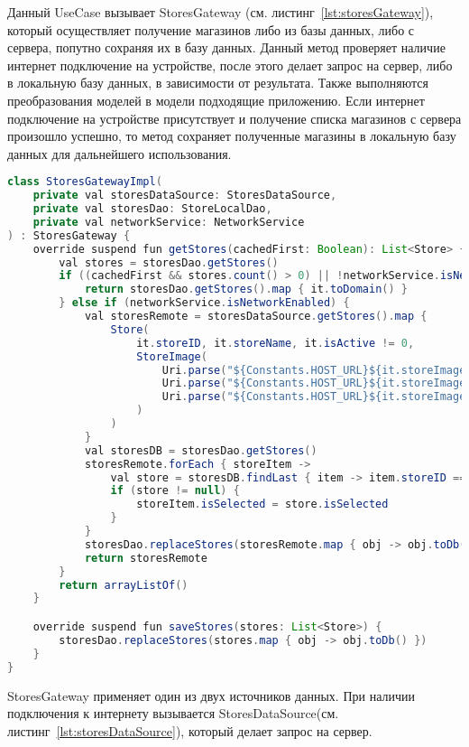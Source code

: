 Данный UseCase вызывает StoresGateway (см. листинг~\ref{lst:storesGateway}), который осуществляет получение магазинов либо из базы данных, либо с сервера, попутно сохраняя их в базу данных. Данный метод проверяет наличие интернет подключение на устройстве, после этого делает запрос на сервер, либо в локальную базу данных, в зависимости от результата. Также выполняются преобразования моделей в модели подходящие приложению. Если интернет подключение на устройстве присутствует и получение списка магазинов с сервера произошло успешно, то метод сохраняет полученные магазины в локальную базу данных для дальнейшего использования.
\begin{lstlisting}[language=Java,label={lst:storesGateway},caption={StoresGateway}]
class StoresGatewayImpl(
    private val storesDataSource: StoresDataSource,
    private val storesDao: StoreLocalDao,
    private val networkService: NetworkService
) : StoresGateway {
    override suspend fun getStores(cachedFirst: Boolean): List<Store> {
        val stores = storesDao.getStores()
        if ((cachedFirst && stores.count() > 0) || !networkService.isNetworkEnabled) {
            return storesDao.getStores().map { it.toDomain() }
        } else if (networkService.isNetworkEnabled) {
            val storesRemote = storesDataSource.getStores().map {
                Store(
                    it.storeID, it.storeName, it.isActive != 0,
                    StoreImage(
                        Uri.parse("${Constants.HOST_URL}${it.storeImage.bannerPath}"),
                        Uri.parse("${Constants.HOST_URL}${it.storeImage.logoPath}"),
                        Uri.parse("${Constants.HOST_URL}${it.storeImage.iconPath}")
                    )
                )
            }
            val storesDB = storesDao.getStores()
            storesRemote.forEach { storeItem ->
                val store = storesDB.findLast { item -> item.storeID == storeItem.id }
                if (store != null) {
                    storeItem.isSelected = store.isSelected
                }
            }
            storesDao.replaceStores(storesRemote.map { obj -> obj.toDb() })
            return storesRemote
        }
        return arrayListOf()
    }

    override suspend fun saveStores(stores: List<Store>) {
        storesDao.replaceStores(stores.map { obj -> obj.toDb() })
    }
}

\end{lstlisting}


StoresGateway применяет один из двух источников данных. При наличии подключения к интернету вызывается StoresDataSource(см. листинг~\ref{lst:storesDataSource}), который делает запрос на сервер.

